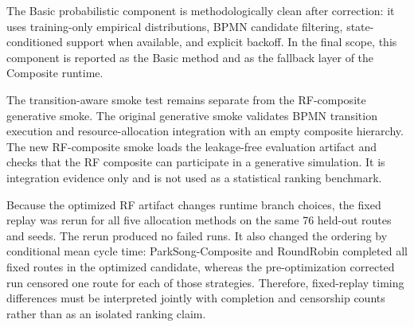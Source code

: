The Basic probabilistic component is methodologically clean after correction:
it uses training-only empirical distributions, BPMN candidate filtering,
state-conditioned support when available, and explicit backoff. In the final
scope, this component is reported as the Basic method and as the fallback layer
of the Composite runtime.

The transition-aware smoke test remains separate from the RF-composite
generative smoke. The original generative smoke validates BPMN transition
execution and resource-allocation integration with an empty composite hierarchy.
The new RF-composite smoke loads the leakage-free evaluation artifact and checks
that the RF composite can participate in a generative simulation. It is
integration evidence only and is not used as a statistical ranking benchmark.

Because the optimized RF artifact changes runtime branch choices, the fixed
replay was rerun for all five allocation methods on the same 76 held-out routes
and seeds. The rerun produced no failed runs. It also changed the ordering by
conditional mean cycle time: ParkSong-Composite and RoundRobin completed all
fixed routes in the optimized candidate, whereas the pre-optimization corrected
run censored one route for each of those strategies. Therefore, fixed-replay
timing differences must be interpreted jointly with completion and censorship
counts rather than as an isolated ranking claim.
